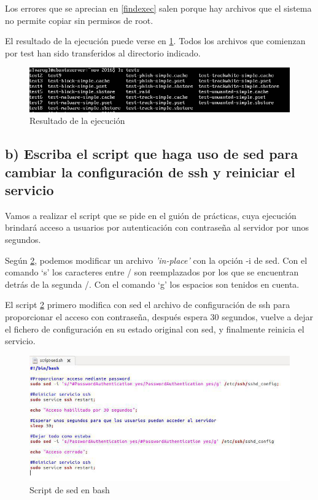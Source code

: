 Los errores que se aprecian en \ref{findexec} salen porque hay archivos que el sistema no permite copiar sin permisos de root.

El resultado de la ejecución puede verse en \ref{resultado}. Todos los archivos que comienzan por test han sido transferidos al directorio indicado.

\begin{figure}[H]
	\centering
	\includegraphics[scale=0.6]{resultado.png}
	\caption{Resultado de la ejecución} \label{resultado}
\end{figure}


\subsection{b) Escriba el script que haga uso de sed para cambiar la configuración de ssh y reiniciar el servicio}

Vamos a realizar el script que se pide en el guión de prácticas, cuya ejecución brindará acceso a usuarios por autenticación con contraseña al servidor por unos segundos.

Según \ref{sed-script}, podemos modificar un archivo \textit{'in-place'} con la opción -i de sed. 
Con el comando `s' los caracteres entre / son reemplazados por los que se encuentran detrás de la segunda /.
Con el comando `g' los espacios son tenidos en cuenta.

El script \ref{sed-script} primero modifica con sed el archivo de configuración de ssh para proporcionar el acceso con contraseña, después espera 30 segundos, vuelve a dejar el fichero de configuración en su estado original con sed, y finalmente reinicia el servicio\cite{sed}.

\begin{figure}[H]
	\centering
	\includegraphics[scale=0.6]{sed-script.png}
	\caption{Script de sed en bash} \label{sed-script}
\end{figure}

